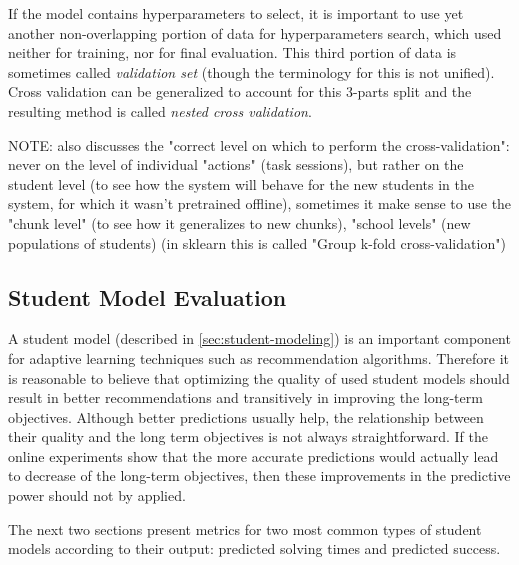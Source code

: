 
If the model contains hyperparameters to select,
  it is important to use yet another non-overlapping portion
  of data for hyperparameters search,
  which used neither for training, nor for final evaluation.
This third portion of data is sometimes called \emph{validation set}
  (though the terminology for this is not unified).
Cross validation can be generalized to account for this 3-parts split
  and the resulting method is called \emph{nested cross validation}.


NOTE: \cite{student-models-review-2012} also discusses the "correct level on
which to perform the cross-validation": never on the level of individual
"actions" (task sessions), but rather on the student level (to see how the
system will behave for the new students in the system, for which it wasn't
pretrained offline), sometimes it make sense to use the "chunk level"
(to see how it generalizes to new chunks), "school levels" (new populations of
students)
(in sklearn this is called "Group k-fold cross-validation")

\subsection{Student Model Evaluation}
\label{sec:student-model-evaluation}

A student model (described in \ref{sec:student-modeling})
  is an important component for adaptive learning techniques
  such as recommendation algorithms.
Therefore it is reasonable to believe that optimizing the quality
  of used student models should result in better recommendations
  and transitively in improving the long-term objectives.
Although better predictions usually help,
  the relationship between their quality and the long term objectives
  is not always straightforward.
If the online experiments show that the more accurate predictions would actually
  lead to decrease of the long-term objectives,
  then these improvements in the predictive power should not by applied.

The next two sections present metrics for two most common
  types of student models according to their output:
  predicted solving times and predicted success.


